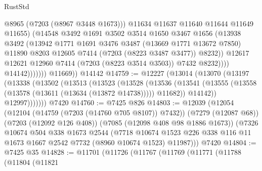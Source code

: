 \begin{lexlean}{RustStd}
\begin{coremodule}
                                @8965
                                (@7203 (@8967 @3448 @1673)))
                              @11634
                              @11637
                              @11640
                              @11644
                              @11649
                              @11655)
                            (@14548
                              @3492
                              @1691
                              @3502
                              @3514
                              @1650
                              @3467
                              @1656
                              (@13938
                                @3492
                                (@13942
                                  @1771
                                  @1691
                                  @3476
                                  @3487
                                  (@13669 @1771 @13672 @7850)
                                  @11890
                                  @8203
                                  @12605
                                  @7414
                                  (@7203 (@8223 @3487 @3477))
                                  @8232))
                              @12617
                              @12621
                              @12960
                              @7414
                              (@7203 (@8223 @3514 @3503))
                              @7432
                              @8232))))
                      @14142)))))))
        @11669))
    @14142
@14759 := @12227
    (@13014
      (@13070
        (@13197
          (@13338
            (@13502
              (@13513
                (@13523
                  (@13528
                    (@13536
                      (@13541 (@13555 (@13558 (@13578 (@13611 (@13634 (@13872 @14738))))) @11682))
                      @14142))
                  @12997)))))))
    @7420
@14760 := @7425 @826
@14803 := @12039
    (@12054
      (@12104 (@14759 (@7203 (@14760 @705 @8107)) @7432))
      (@7279 (@12087 @68))
      (@7203 (@12092 @126 @408))
      (@7085 (@12098 @408 @98 @1886 @1673))
      (@7326
        @10674
        @504
        @338
        @1673
        @2544
        (@7718
          @10674
          @1523
          @226
          @338
          @116
          @11
          @1673
          @1667
          @2542
          @7732
          (@8960 @10674 @1523)
          @11987)))
    @7420
@14804 := @7425 @35
@14828 := @11701
    (@11726
      (@11767
        (@11769
          (@11771
            (@11788
              (@11804
                (@11821

\end{coremodule}
\end{lexlean}
